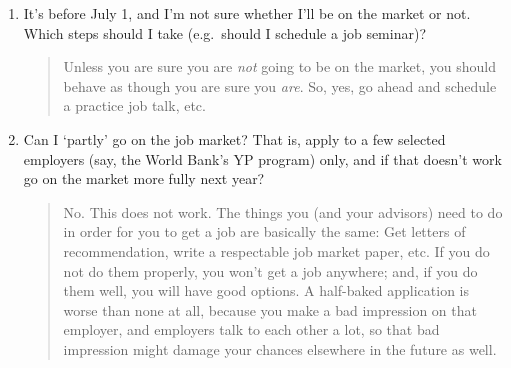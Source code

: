 \documentclass{\classes/econtex}
\begin{document}
\begin{enumerate}
\begin{quote}

  \end{quote}
\item It's before July 1, and I'm not sure whether I'll be on the market or not. Which steps should I take (e.g.\ should I schedule a job seminar)?

  \begin{quote}
    Unless you are sure you are \textit{not} going to be on the market, you should behave as though you are sure you \textit{are}.  So, yes, go ahead and schedule a practice job talk, etc.

  \end{quote}
\item  Can I `partly' go on the job market?  That is, apply to a few
  selected employers (say, the World Bank's YP program) only, and 
  if that doesn't work go on the market more fully next year?

  \begin{quote}
    No.  This does not work.  The things you (and your advisors) need to do in order for you to
    get a job are basically the same: Get letters of recommendation, 
    write a respectable job market paper, etc.  If you do not do them
    properly, you won't get a job anywhere; and, if you do them well,
    you will have good options.  A half-baked application is worse than
    none at all, because you make a bad impression on that employer, and 
    employers talk to each other a lot, so that bad impression might damage
    your chances elsewhere in the future as well.  


\end{quote}
\end{enumerate}
\end{document}
